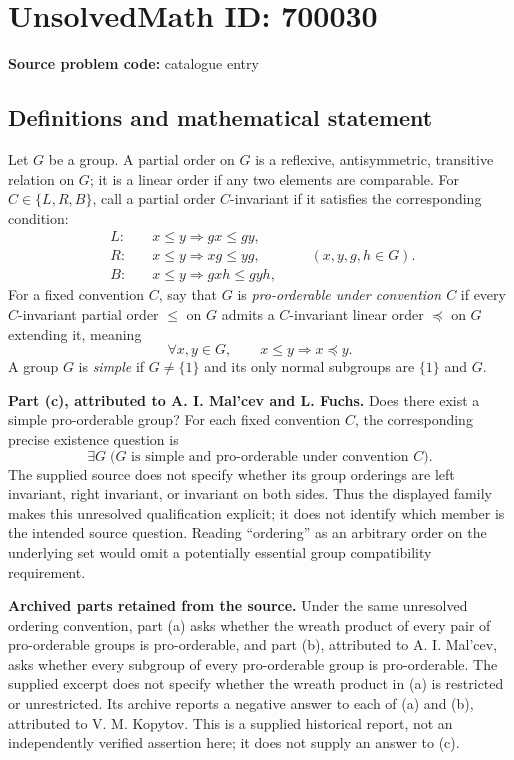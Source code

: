 \documentclass[11pt]{article}
\begin{document}
\section*{UnsolvedMath ID: 700030}
\textbf{Source problem code:} catalogue entry
\subsection{Definitions and mathematical statement}
Let \(G\) be a group. A partial order on \(G\) is a reflexive, antisymmetric, transitive relation on \(G\); it is a linear order if any two elements are comparable. For \(C\in\{L,R,B\}\), call a partial order \(C\)-invariant if it satisfies the corresponding condition:
\[
\begin{aligned}
L:&\quad x\leq y\Longrightarrow gx\leq gy,\\
R:&\quad x\leq y\Longrightarrow xg\leq yg,\\
B:&\quad x\leq y\Longrightarrow gxh\leq gyh,
\end{aligned}
\qquad(x,y,g,h\in G).
\]
For a fixed convention \(C\), say that \(G\) is \emph{pro-orderable under convention \(C\)} if every \(C\)-invariant partial order \(\leq\) on \(G\) admits a \(C\)-invariant linear order \(\preccurlyeq\) on \(G\) extending it, meaning
\[
\forall x,y\in G,\qquad x\leq y\Longrightarrow x\preccurlyeq y.
\]
A group \(G\) is \emph{simple} if \(G\neq\{1\}\) and its only normal subgroups are \(\{1\}\) and \(G\).

\textbf{Part (c), attributed to A. I. Mal'cev and L. Fuchs.} Does there exist a simple pro-orderable group? For each fixed convention \(C\), the corresponding precise existence question is
\[
\exists G\;\bigl(G\text{ is simple and pro-orderable under convention }C\bigr).
\]
The supplied source does not specify whether its group orderings are left invariant, right invariant, or invariant on both sides. Thus the displayed family makes this unresolved qualification explicit; it does not identify which member is the intended source question. Reading ``ordering'' as an arbitrary order on the underlying set would omit a potentially essential group compatibility requirement.

\textbf{Archived parts retained from the source.} Under the same unresolved ordering convention, part (a) asks whether the wreath product of every pair of pro-orderable groups is pro-orderable, and part (b), attributed to A. I. Mal'cev, asks whether every subgroup of every pro-orderable group is pro-orderable. The supplied excerpt does not specify whether the wreath product in (a) is restricted or unrestricted. Its archive reports a negative answer to each of (a) and (b), attributed to V. M. Kopytov. This is a supplied historical report, not an independently verified assertion here; it does not supply an answer to (c).
\end{document}
